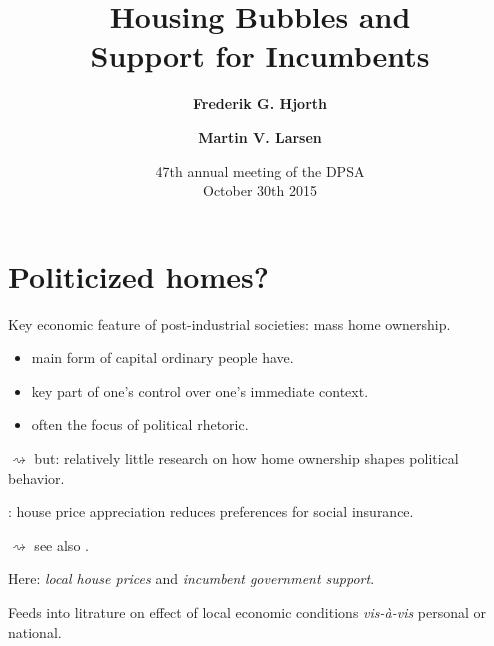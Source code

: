 \documentclass[aspectratio=169]{beamer}
\title[Housing bubbles]{Housing Bubbles and \\Support for Incumbents}
\author{\textbf{Frederik G. Hjorth} \and \textbf{Martin V. Larsen}}
\institute[UCPH]{\small Department of Political Science \\ University of Copenhagen}
\date[October 2015]{ 47th annual meeting of the DPSA \\ October 30th 2015}
\begin{document}
	
	\begin{frame}
		\titlepage
	\end{frame}
	
	
	\AtBeginSection[]{\begin{frame}{Outline}
			\tableofcontents[currentsection] 
		\end{frame}}
	
\section{Politicized homes?}

	\begin{frame}
	Key economic feature of post-industrial societies: mass home ownership.
	
	\vspace{0.2in} 

	\begin{itemize}
		\item main form of capital ordinary people have.
		\item key part of one's control over one's immediate context.
		\item often the focus of political rhetoric.
	\end{itemize}
	
		\vspace{0.2in} \pause
		
	$\rightsquigarrow$ but: relatively little research on how home ownership shapes political behavior.
		\end{frame}	
	
		\begin{frame}
		\citet{ansell2014political}: house price appreciation reduces preferences for social insurance. 
		
		$\rightsquigarrow$ see also \citet{di2007formation}.
						
		\vspace{0.3in}	\pause
						
		Here: \emph{local house prices} and \emph{incumbent government support}.					
		
		\vspace{0.3in} \pause	
		
		Feeds into litrature on effect of local economic conditions \textit{vis-à-vis} personal or national.
       			
		\end{frame}	
		
\end{document}
